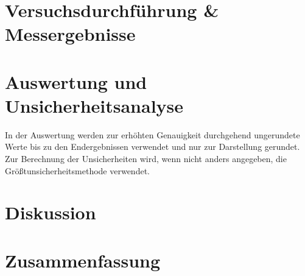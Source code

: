 \documentclass[12pt,a4paper,twoside]{article}
\begin{document}
\section{Versuchsdurchführung \& Messergebnisse} %


\section{Auswertung und Unsicherheitsanalyse} %

In der Auswertung werden zur erhöhten Genauigkeit durchgehend ungerundete Werte bis zu den Endergebnissen verwendet und nur zur Darstellung gerundet. \\
Zur Berechnung der Unsicherheiten wird, wenn nicht anders angegeben, die Größtunsicherheitsmethode verwendet.


\section{Diskussion} %


\section{Zusammenfassung} %


\printbibliography[heading=bibintoc]
\end{document}
